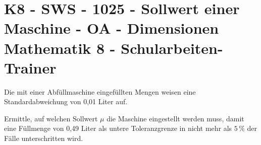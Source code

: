 \section{K8 - SWS - 1025 - Sollwert einer Maschine - OA - Dimensionen Mathematik 8 - Schularbeiten-Trainer}

\begin{beispiel}[K8 - SWS]{1}
Die mit einer Abfüllmaschine eingefüllten Mengen weisen eine Standardabweichung von 0,01 Liter auf.

Ermittle, auf welchen Sollwert $\mu$ die Maschine eingestellt werden muss, damit eine Füllmenge von 0,49 Liter als untere Toleranzgrenze in nicht mehr als $5\,\%$ der Fälle unterschritten wird.

\end{beispiel}